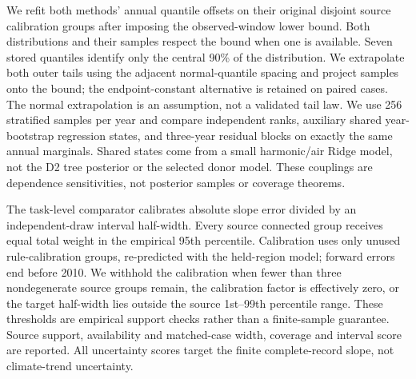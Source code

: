 We refit both methods' annual quantile offsets on their original disjoint source calibration groups after imposing the observed-window lower bound. Both distributions and their samples respect the bound when one is available. Seven stored quantiles identify only the central 90\% of the distribution. We extrapolate both outer tails using the adjacent normal-quantile spacing and project samples onto the bound; the endpoint-constant alternative is retained on paired cases. The normal extrapolation is an assumption, not a validated tail law. We use 256 stratified samples per year and compare independent ranks, auxiliary shared year-bootstrap regression states, and three-year residual blocks on exactly the same annual marginals. Shared states come from a small harmonic/air Ridge model, not the D2 tree posterior or the selected donor model. These couplings are dependence sensitivities, not posterior samples or coverage theorems.

The task-level comparator calibrates absolute slope error divided by an independent-draw interval half-width. Every source connected group receives equal total weight in the empirical 95th percentile. Calibration uses only unused rule-calibration groups, re-predicted with the held-region model; forward errors end before 2010. We withhold the calibration when fewer than three nondegenerate source groups remain, the calibration factor is effectively zero, or the target half-width lies outside the source 1st--99th percentile range. These thresholds are empirical support checks rather than a finite-sample guarantee. Source support, availability and matched-case width, coverage and interval score are reported. All uncertainty scores target the finite complete-record slope, not climate-trend uncertainty.
